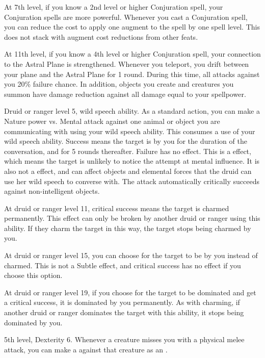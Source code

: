     At 7th level, if you know a 2nd level or higher Conjuration spell, your Conjuration spells are more powerful.
    Whenever you cast a Conjuration spell, you can reduce the cost to apply one augment to the spell by one spell level.
    This does not stack with augment cost reductions from other feats.

    At 11th level, if you know a 4th level or higher Conjuration spell, your connection to the Astral Plane is strengthened.
    Whenever you teleport, you drift between your plane and the Astral Plane for 1 round.
    During this time, all attacks against you 20\% failure chance.
    In addition, objects you create and creatures you summon have damage reduction against all damage equal to your spellpower.

    \featpres Druid or ranger level 5, wild speech ability.
    \featben  As a standard action, you can make a Nature power vs. Mental attack against one animal or object you are communicating with using your wild speech ability.
    This consumes a use of your wild speech ability.
    Success means the target is \charmed by you for the duration of the conversation, and for 5 rounds thereafter.
    Failure has no effect.
    This is a  effect, which means the target is unlikely to notice the attempt at mental influence.
    It is also not a  effect, and can affect objects and elemental forces that the druid can use her wild speech to converse with.
    The attack automatically critically succeeds against non-intelligent objects.

    At druid or ranger level 11, critical success means the target is charmed permanently.
    This effect can only be broken by another druid or ranger using this ability.
    If they charm the target in this way, the target stops being charmed by you.

    At druid or ranger level 15, you can choose for the target to be \dominated by you instead of charmed.
    This is not a Subtle effect, and critical success has no effect if you choose this option.

    At druid or ranger level 19, if you choose for the target to be dominated and get a critical success, it is dominated by you permanently.
    As with charming, if another druid or ranger dominates the target with this ability, it stops being dominated by you.

    \featpres 5th level, Dexterity 6.
    \featben Whenever a creature misses you with a physical melee attack, you can make a  against that creature as an .

